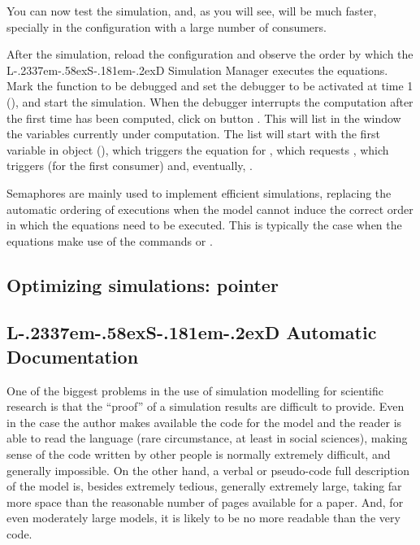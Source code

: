 \documentclass [11pt,a4paper] {book}
\def\LsD{{L\kern-.2337em\lower-.58ex\hbox{S}\kern-.181em\lower-.2ex\hbox{D}}\xspace}
\begin{document}
You can now test the simulation, and, as you will see, will be much faster, specially in the configuration with a large number of consumers. 

After the simulation, reload the configuration and observe the order by which the \LsD Simulation Manager executes the equations. Mark the function  to be debugged and set the debugger to be activated at time 1 (), and start the simulation. When the debugger interrupts the computation after the first time  has been computed, click on button . This will list in the  window the variables currently under computation. The list will start with the first variable in object  (), which triggers the equation for , which requests , which triggers  (for the first consumer) and, eventually, .

Semaphores are mainly used to implement efficient simulations, replacing the automatic ordering of executions when the model cannot induce the correct order in which the equations need to be executed. This is typically the case when the equations make use of the commands  or .

\subsection{Optimizing simulations: pointer }







\subsection{\LsD Automatic Documentation}

One of the biggest problems in the use of simulation modelling for scientific research is that the ``proof'' of a simulation results are difficult to provide. Even in the case the author makes available the code for the model and the reader is able to read the language (rare circumstance, at least in social sciences), making sense of the code written by other people is normally extremely difficult, and generally impossible. On the other hand, a verbal or pseudo-code full description of the model is, besides extremely tedious, generally extremely large, taking far more space than the reasonable number of pages available for a paper. And, for even moderately large models, it is likely to be no more readable than the very code. 
\end{document}
